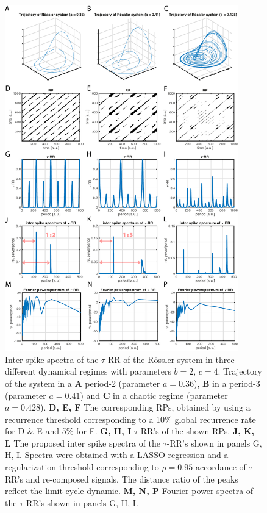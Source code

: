 \begin{figure}
 \centering
 \includegraphics[width=0.9\textwidth]{./figures/fig_tau_rr_example_roessler}
 \caption{Inter spike spectra of the $\tau$-RR of the R\"ossler system in three different dynamical regimes with parameters $b=2$, $c=4$. 
 Trajectory of the system in a \textbf{A} period-2 (parameter $a=0.36$), \textbf{B} in a period-3 (parameter $a=0.41$) and 
 \textbf{C} in a chaotic regime (parameter $a=0.428$). 
 \textbf{D, E, F} The corresponding RPs, obtained by using a recurrence threshold corresponding to a 10\% global 
 recurrence rate for D \& E and 5\% for F. 
  \textbf{G, H, I} $\tau$-RR's of the shown RPs. 
  \textbf{J, K, L} The proposed inter spike spectra of the $\tau$-RR's shown in panels G, H, I. Spectra were obtained with a LASSO regression and a regularization threshold 
  corresponding to $\rho=0.95$ accordance of $\tau$-RR's and re-composed signals. The distance ratio of the peaks reflect the limit cycle dynamic.  
  \textbf{M, N, P} Fourier power spectra of the $\tau$-RR's shown in panels G, H, I.
 }
\label{fig_tau_rr_example_roessler}
\end{figure}

